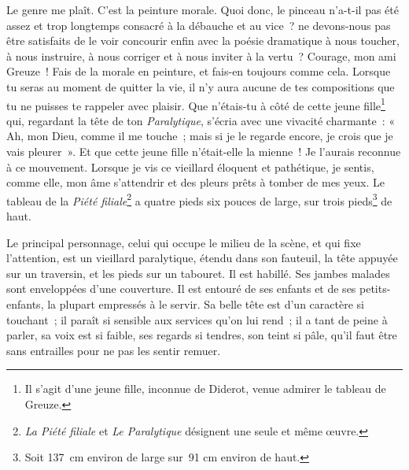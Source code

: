 {

Le genre me plaît. C'est la peinture morale. Quoi donc, le pinceau n'a-t-il pas été assez et trop longtemps consacré à la débauche et au vice~? ne devons-nous pas être satisfaits de le voir concourir enfin avec la poésie dramatique à nous toucher, à nous instruire, à nous corriger et à nous inviter à la vertu~? Courage, mon ami Greuze~! Fais de la morale en peinture, et fais-en toujours comme cela. Lorsque tu seras au moment de quitter la vie, il n'y aura aucune de tes compositions que tu ne puisses te rappeler avec plaisir. Que n'étais-tu à côté de cette jeune fille\footnote{Il s'agit d'une jeune fille, inconnue de Diderot, venue admirer le tableau de Greuze.} qui, regardant la tête de ton \emph{Paralytique}, s'écria avec une vivacité charmante~: «~ Ah, mon Dieu, comme il me touche~; mais si je le regarde encore, je crois que je vais pleurer~». Et que cette jeune fille n'était-elle la mienne~! Je l'aurais reconnue à ce mouvement. Lorsque je vis ce vieillard éloquent et pathétique, je sentis, comme elle, mon âme s'attendrir et des pleurs prêts à tomber de mes yeux.
Le tableau de la \emph{Piété filiale}\footnote{\emph{La Piété filiale} et \emph{Le Paralytique} désignent une seule et même œuvre.} a quatre pieds six pouces de large, sur trois pieds\footnote{Soit 137~cm environ de large sur~91 cm environ de haut.} de haut.

Le principal personnage, celui qui occupe le milieu de la scène, et qui fixe l'attention, est un vieillard paralytique, étendu dans son fauteuil, la tête appuyée sur un traversin, et les pieds sur un tabouret. Il est habillé. Ses jambes malades sont enveloppées d'une couverture. Il est entouré de ses enfants et de ses petits-enfants, la plupart empressés à le servir. Sa belle tête est d'un caractère si touchant~; il paraît si sensible aux services qu'on lui rend~; il a tant de peine à parler, sa voix est si faible, ses regards si tendres, son teint si pâle, qu'il faut être sans entrailles pour ne pas les sentir remuer.
}

